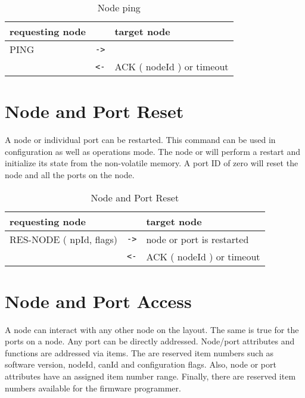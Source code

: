 \begin{table}[ht!]
    \begin{center}
        \caption{Node ping}
        \begin{tabular}{|p{} c p{}|}
            \toprule
            \textbf{requesting node} & & \textbf{ target node} \\
            \midrule
            PING & \texttt{->} & \\
            \midrule
            & \texttt{<-} & ACK ( nodeId ) or timeout \\
            \bottomrule
        \end{tabular}
    \end{center}
\end{table}

\section{Node and Port Reset}

A node or individual port can be restarted. This command can be used in configuration as well as operations mode. The node or will perform a restart and initialize its state from the non-volatile memory. A port ID of zero will reset the node and all the ports on the node.

\begin{table}[ht!]
    \begin{center}
        \caption{Node and Port Reset}
        \begin{tabular}{|p{} c p{}|}
            \toprule
            \textbf{requesting node} & & \textbf{ target node} \\
            \midrule
            RES-NODE ( npId, flags) & \texttt{->} & node or port is restarted \\
            \midrule
            & \texttt{<-} & ACK ( nodeId ) or timeout \\
            \bottomrule
        \end{tabular}
    \end{center}
\end{table}

\section{Node and Port Access}

A node can interact with any other node on the layout. The same is true for the ports on a node. Any port can be directly addressed. Node/port attributes and functions are addressed via items. The are reserved item numbers such as software version, nodeId, canId and configuration flags. Also, node or port attributes have an assigned item number range. Finally, there are reserved item numbers available for the firmware programmer.

